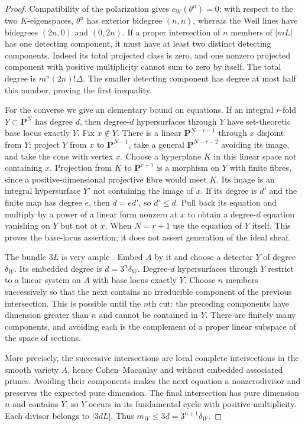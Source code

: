 \begin{proof}
Compatibility of the polarization gives $e_W(\theta^n)=0$: with respect to the two $K$-eigenspaces, $\theta^n$ has exterior bidegree $(n,n)$, whereas the Weil lines have bidegrees $(2n,0)$ and $(0,2n)$. If a proper intersection of $n$ members of $|mL|$ has one detecting component, it must have at least two distinct detecting components. Indeed its total projected class is zero, and one nonzero projected component with positive multiplicity cannot sum to zero by itself. The total degree is $m^n(2n)!\Delta$. The smaller detecting component has degree at most half this number, proving the first inequality.

For the converse we give an elementary bound on equations. If an integral $r$-fold $Y\subset\mathbf P^N$ has degree $d$, then degree-$d$ hypersurfaces through $Y$ have set-theoretic base locus exactly $Y$. Fix $x\notin Y$. There is a linear $\mathbf P^{N-r-1}$ through $x$ disjoint from $Y$: project $Y$ from $x$ to $\mathbf P^{N-1}$, take a general $\mathbf P^{N-r-2}$ avoiding its image, and take the cone with vertex $x$. Choose a hyperplane $K$ in this linear space not containing $x$. Projection from $K$ to $\mathbf P^{r+1}$ is a morphism on $Y$ with finite fibres, since a positive-dimensional projective fibre would meet $K$. Its image is an integral hypersurface $Y'$ not containing the image of $x$. If its degree is $d'$ and the finite map has degree $e$, then $d=ed'$, so $d'\leq d$. Pull back its equation and multiply by a power of a linear form nonzero at $x$ to obtain a degree-$d$ equation vanishing on $Y$ but not at $x$. When $N=r+1$ use the equation of $Y$ itself. This proves the base-locus assertion; it does not assert generation of the ideal sheaf.

The bundle $3L$ is very ample \cite[Remark~7.3, p.~12]{MilneAV}. Embed $A$ by it and choose a detector $Y$ of degree $\delta_W$. Its embedded degree is $d=3^n\delta_W$. Degree-$d$ hypersurfaces through $Y$ restrict to a linear system on $A$ with base locus exactly $Y$. Choose $n$ members successively so that the next contains no irreducible component of the previous intersection. This is possible until the $n$th cut: the preceding components have dimension greater than $n$ and cannot be contained in $Y$. There are finitely many components, and avoiding each is the complement of a proper linear subspace of the space of sections.

More precisely, the successive intersections are local complete intersections in the smooth variety $A$, hence Cohen--Macaulay and without embedded associated primes. Avoiding their components makes the next equation a nonzerodivisor and preserves the expected pure dimension. The final intersection has pure dimension $n$ and contains $Y$, so $Y$ occurs in its fundamental cycle with positive multiplicity. Each divisor belongs to $|3dL|$. Thus $m_W\leq3d=3^{n+1}\delta_W$.
\end{proof}

